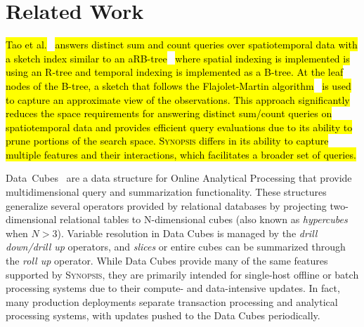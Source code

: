 \section{Related Work}
\label{sec:related}
\hl{Tao et al.}~\cite{tao2004spatio} \hl{answers distinct sum and count queries over spatiotemporal data with a sketch index similar to an aRB-tree}~\cite{papadias2002indexing} \hl{where spatial indexing is implemented is using an R-tree and temporal indexing is implemented as a B-tree.  At the leaf nodes of the B-tree, a sketch that follows the Flajolet-Martin algorithm}~\cite{flajolet1985probabilistic} \hl{is used to capture an approximate view of the observations.
This approach significantly reduces the space requirements for answering distinct sum/count queries on spatiotemporal data and provides efficient query evaluations due to its ability to prune portions of the search space.
\textsc{Synopsis} differs in its ability to capture multiple features and their interactions, which facilitates a broader set of queries.}

Data~Cubes~\cite{gray1996data,harinarayan1996implementing,mumick1997maintenance,ho1997range} are a data structure for Online Analytical Processing that provide multidimensional query and summarization functionality. These structures generalize several operators provided by relational databases by projecting two-dimensional relational tables to N-dimensional cubes (also known as \emph{hypercubes} when $N > 3$). Variable resolution in Data Cubes is managed by the \emph{drill down/drill up} operators, and \emph{slices} or entire cubes can be summarized through the \emph{roll up} operator. While Data Cubes provide many of the same features supported by \textsc{Synopsis}, they are primarily intended for single-host offline or batch processing systems due to their compute- and data-intensive updates. In fact, many production deployments separate transaction processing and analytical processing systems, with updates pushed to the Data Cubes periodically. 


